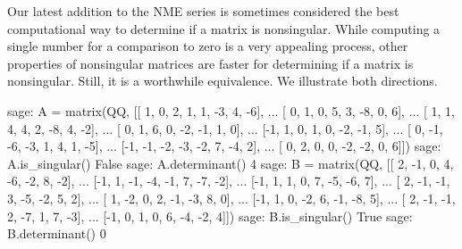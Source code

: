 Our latest addition to the NME series is sometimes considered the best computational way to determine if a matrix is nonsingular.  While computing a single number for a comparison to zero is a very appealing process, other properties of nonsingular matrices are faster for determining if a matrix is nonsingular.  Still, it is a worthwhile equivalence.  We illustrate both directions.
%
\begin{sageexample}
sage: A = matrix(QQ, [[ 1,  0,  2,  1,  1, -3,  4, -6],
...                   [ 0,  1,  0,  5,  3, -8,  0,  6],
...                   [ 1,  1,  4,  4,  2, -8,  4, -2],
...                   [ 0,  1,  6,  0, -2, -1,  1,  0],
...                   [-1,  1,  0,  1,  0, -2, -1,  5],
...                   [ 0, -1, -6, -3,  1,  4,  1, -5],
...                   [-1, -1, -2, -3, -2,  7, -4,  2],
...                   [ 0,  2,  0,  0, -2, -2,  0,  6]])
sage: A.is_singular()
False
sage: A.determinant()
4
sage: B = matrix(QQ, [[ 2, -1,  0,  4, -6, -2,  8, -2],
...                   [-1,  1, -1, -4, -1,  7, -7, -2],
...                   [-1,  1,  1,  0,  7, -5, -6,  7],
...                   [ 2, -1, -1,  3, -5, -2,  5,  2],
...                   [ 1, -2,  0,  2, -1, -3,  8,  0],
...                   [-1,  1,  0, -2,  6, -1, -8,  5],
...                   [ 2, -1, -1,  2, -7,  1,  7, -3],
...                   [-1,  0,  1,  0,  6, -4, -2,  4]])
sage: B.is_singular()
True
sage: B.determinant()
0
\end{sageexample}
%
\begin{sageverbatim}
\end{sageverbatim}
%
